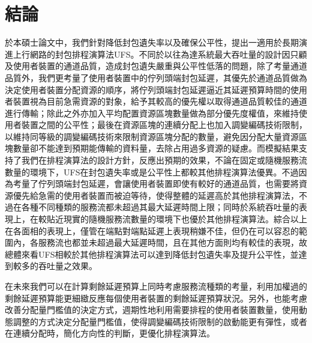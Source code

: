%
\chapter{結論}
於本碩士論文中，我們針對降低封包遺失率以及確保公平性，提出一適用於長期演進上行網路的封包排程演算法UFS。不同於以往為達系統最大吞吐量的設計因只顧及使用者裝置的通道品質，造成封包遺失嚴重與公平性低落的問題，除了考量通道品質外，我們更考量了使用者裝置中的佇列頭端封包延遲，其優先於通道品質做為決定使用者裝置分配資源的順序，將佇列頭端封包延遲逼近其延遲預算時間的使用者裝置視為目前急需資源的對象，給予其較高的優先權以取得通道品質較佳的通道進行傳輸；除此之外亦加入平均配置資源區塊數量做為部分優先度權值，來維持使用者裝置之間的公平性；最後在資源區塊的連續分配上也加入調變編碼技術限制，以維持同等級的調變編碼技術來限制資源區塊分配的數量，避免因分配大量資源區塊數量卻不能達到預期能傳輸的資料量，去除占用過多資源的疑慮。而模擬結果支持了我們在排程演算法的設計方針，反應出預期的效果，不論在固定或隨機服務流數量的環境下，UFS在封包遺失率或是公平性上都較其他排程演算法優異。不過因為考量了佇列頭端封包延遲，會讓使用者裝置即使有較好的通道品質，也需要將資源優先給急需的使用者裝置而被迫等待，使得整體的延遲高於其他排程演算法，不過在各種不同種類的服務流都未超過其最大延遲時間上限；同時於系統吞吐量的表現上，在較貼近現實的隨機服務流數量的環境下也優於其他排程演算法。綜合以上在各面相的表現上，僅管在端點對端點延遲上表現稍嫌不佳，但仍在可以容忍的範圍內，各服務流也都並未超過最大延遲時間，且在其他方面則均有較佳的表現，故總體來看UFS相較於其他排程演算法可以達到降低封包遺失率及提升公平性，並達到較多的吞吐量之效果。

在未來我們可以在計算剩餘延遲預算上同時考慮服務流種類的考量，利用加權過的剩餘延遲預算能更細緻反應每個使用者裝置的剩餘延遲預算狀況。另外，也能考慮改善分配量門檻值的決定方式，週期性地利用需要排程的使用者裝置數量，使用動態調整的方式決定分配量門檻值，使得調變編碼技術限制的啟動能更有彈性，或者在連續分配時，簡化方向性的判斷，更優化排程演算法。